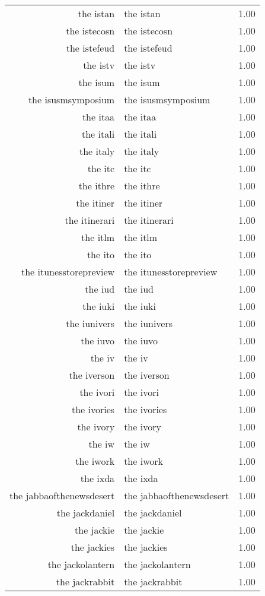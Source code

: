 \begin{table}[ht]
\begin{tabular}{rlr}
  the istan & the istan & 1.00 \\ 
  the istecosn & the istecosn & 1.00 \\ 
  the istefeud & the istefeud & 1.00 \\ 
  the istv & the istv & 1.00 \\ 
  the isum & the isum & 1.00 \\ 
  the isusmsymposium & the isusmsymposium & 1.00 \\ 
  the itaa & the itaa & 1.00 \\ 
  the itali & the itali & 1.00 \\ 
  the italy & the italy & 1.00 \\ 
  the itc & the itc & 1.00 \\ 
  the ithre & the ithre & 1.00 \\ 
  the itiner & the itiner & 1.00 \\ 
  the itinerari & the itinerari & 1.00 \\ 
  the itlm & the itlm & 1.00 \\ 
  the ito & the ito & 1.00 \\ 
  the itunesstorepreview & the itunesstorepreview & 1.00 \\ 
  the iud & the iud & 1.00 \\ 
  the iuki & the iuki & 1.00 \\ 
  the iunivers & the iunivers & 1.00 \\ 
  the iuvo & the iuvo & 1.00 \\ 
  the iv & the iv & 1.00 \\ 
  the iverson & the iverson & 1.00 \\ 
  the ivori & the ivori & 1.00 \\ 
  the ivories & the ivories & 1.00 \\ 
  the ivory & the ivory & 1.00 \\ 
  the iw & the iw & 1.00 \\ 
  the iwork & the iwork & 1.00 \\ 
  the ixda & the ixda & 1.00 \\ 
  the jabbaofthenewsdesert & the jabbaofthenewsdesert & 1.00 \\ 
  the jackdaniel & the jackdaniel & 1.00 \\ 
  the jackie & the jackie & 1.00 \\ 
  the jackies & the jackies & 1.00 \\ 
  the jackolantern & the jackolantern & 1.00 \\ 
  the jackrabbit & the jackrabbit & 1.00 \\ 

\end{tabular}
\end{table}
